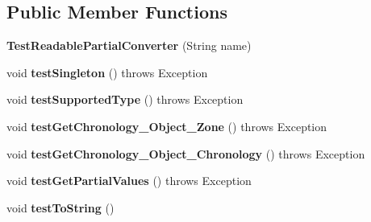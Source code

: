 \subsection*{Public Member Functions}
\begin{DoxyCompactItemize}
\item 
\hypertarget{classorg_1_1joda_1_1time_1_1convert_1_1_test_readable_partial_converter_affb99d271e08ba479e14145e0aa24cce}{{\bfseries Test\-Readable\-Partial\-Converter} (String name)}\label{classorg_1_1joda_1_1time_1_1convert_1_1_test_readable_partial_converter_affb99d271e08ba479e14145e0aa24cce}

\item 
\hypertarget{classorg_1_1joda_1_1time_1_1convert_1_1_test_readable_partial_converter_a7cb97ce628bfa7be9942545efe59d3c8}{void {\bfseries test\-Singleton} ()  throws Exception }\label{classorg_1_1joda_1_1time_1_1convert_1_1_test_readable_partial_converter_a7cb97ce628bfa7be9942545efe59d3c8}

\item 
\hypertarget{classorg_1_1joda_1_1time_1_1convert_1_1_test_readable_partial_converter_a406543fc07a1ec146f4044b366da4f0c}{void {\bfseries test\-Supported\-Type} ()  throws Exception }\label{classorg_1_1joda_1_1time_1_1convert_1_1_test_readable_partial_converter_a406543fc07a1ec146f4044b366da4f0c}

\item 
\hypertarget{classorg_1_1joda_1_1time_1_1convert_1_1_test_readable_partial_converter_ad135af1ccadc1b4f79c53b2d9ea05b60}{void {\bfseries test\-Get\-Chronology\-\_\-\-Object\-\_\-\-Zone} ()  throws Exception }\label{classorg_1_1joda_1_1time_1_1convert_1_1_test_readable_partial_converter_ad135af1ccadc1b4f79c53b2d9ea05b60}

\item 
\hypertarget{classorg_1_1joda_1_1time_1_1convert_1_1_test_readable_partial_converter_a6cc37b8dc13c81209a820cb34391c674}{void {\bfseries test\-Get\-Chronology\-\_\-\-Object\-\_\-\-Chronology} ()  throws Exception }\label{classorg_1_1joda_1_1time_1_1convert_1_1_test_readable_partial_converter_a6cc37b8dc13c81209a820cb34391c674}

\item 
\hypertarget{classorg_1_1joda_1_1time_1_1convert_1_1_test_readable_partial_converter_a2421f0ab47eb97ad0230fdc3bfe60598}{void {\bfseries test\-Get\-Partial\-Values} ()  throws Exception }\label{classorg_1_1joda_1_1time_1_1convert_1_1_test_readable_partial_converter_a2421f0ab47eb97ad0230fdc3bfe60598}

\item 
\hypertarget{classorg_1_1joda_1_1time_1_1convert_1_1_test_readable_partial_converter_ad19cffac1212139cb440b484eb63d335}{void {\bfseries test\-To\-String} ()}\label{classorg_1_1joda_1_1time_1_1convert_1_1_test_readable_partial_converter_ad19cffac1212139cb440b484eb63d335}

\end{DoxyCompactItemize}
